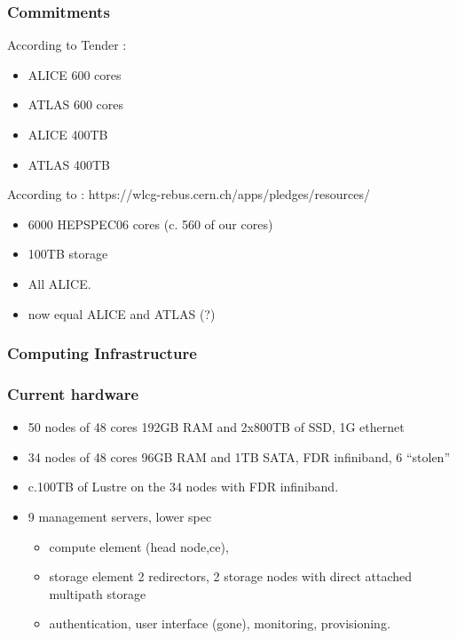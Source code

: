 \documentclass{beamer}
\begin{document}
\begin{frame}
\frametitle{Commitments}
According to Tender :
\begin{itemize}
  \item ALICE 600 cores
  \item ATLAS 600 cores
  \item ALICE 400TB
  \item ATLAS 400TB
\end{itemize}
According to :
https://wlcg-rebus.cern.ch/apps/pledges/resources/
\begin{itemize}
  \item 6000 HEPSPEC06 cores (c. 560 of our cores)
  \item 100TB storage
  \item All ALICE.
  \item now equal ALICE and ATLAS (?)
\end{itemize}
\end{frame}

\begin{frame}
  \frametitle{Computing Infrastructure}
\end{frame}

\begin{frame}
  \frametitle{Current hardware}
  \begin{itemize}
    \item 50 nodes of 48 cores 192GB RAM and 2x800TB of SSD, 1G ethernet
    \item 34 nodes of 48 cores 96GB RAM and 1TB SATA, FDR infiniband, 6 ``stolen''
    \item c.100TB of Lustre on the 34 nodes with FDR infiniband.
    \item 9 management servers, lower spec 
  \begin{itemize}
    \item compute element (head node,ce),
    \item storage element 2 redirectors, 2 storage nodes with direct attached multipath storage
    \item authentication, user interface (gone), monitoring, provisioning.
  \end{itemize} 
  \end{itemize}
\end{frame}
\end{document}
